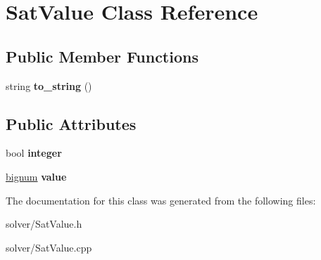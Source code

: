 \hypertarget{classSatValue}{\section{\-Sat\-Value \-Class \-Reference}
\label{classSatValue}
}
\subsection*{\-Public \-Member \-Functions}
\begin{DoxyCompactItemize}
\item 
\hypertarget{classSatValue_a51713b4832cc812f019dcfa00aaecc66}{string {\bfseries to\-\_\-string} ()}\label{classSatValue_a51713b4832cc812f019dcfa00aaecc66}

\end{DoxyCompactItemize}
\subsection*{\-Public \-Attributes}
\begin{DoxyCompactItemize}
\item 
\hypertarget{classSatValue_a19af7b15b65ae5ee0ab8669571d4fdd3}{bool {\bfseries integer}}\label{classSatValue_a19af7b15b65ae5ee0ab8669571d4fdd3}

\item 
\hypertarget{classSatValue_a5058f4386247e43eceb43f936fd32c88}{\hyperlink{classbignum}{bignum} {\bfseries value}}\label{classSatValue_a5058f4386247e43eceb43f936fd32c88}

\end{DoxyCompactItemize}


\-The documentation for this class was generated from the following files\-:\begin{DoxyCompactItemize}
\item 
solver/\-Sat\-Value.\-h\item 
solver/\-Sat\-Value.\-cpp\end{DoxyCompactItemize}
